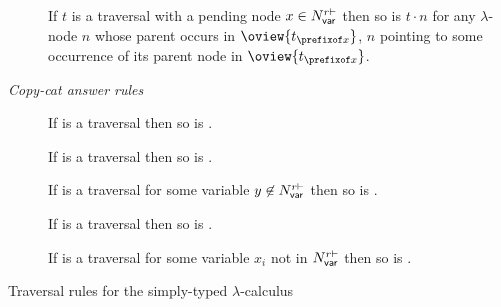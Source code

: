 \begin{table}[htbp]
\begin{description}
\item[] If $t$ is a traversal with a pending node
  $x \in N_{\sf var}^{r\vdash}$ then so is $t \cdot n$ for any $\lambda$-node $n$ whose parent occurs in  $\oview{t_{\prefixof x}}$, $n$ pointing to some occurrence of its
  parent node in $\oview{t_{\prefixof x}}$.
\end{description}

\noindent \emph{Copy-cat answer rules}
\begin{description}
\item[]
  If 
is a traversal then so is .

\item[] If 
is a traversal then so is .

\item[] If  is a
traversal for some variable $y\not\in N_{\sf var}^{r\vdash}$ then so is .

\item[] If 
is a traversal then so is .
\end{description}

\begin{description}
\item[]
If  is a traversal for some variable
    $x_i$ not in $N_{\sf var}^{r\vdash}$ then
so is .
\end{description}
\caption[Traversal rules for the simply-typed lambda-calculus]{Traversal rules for the simply-typed $\lambda$-calculus}
\label{tab:trav_rules}
\end{table}

